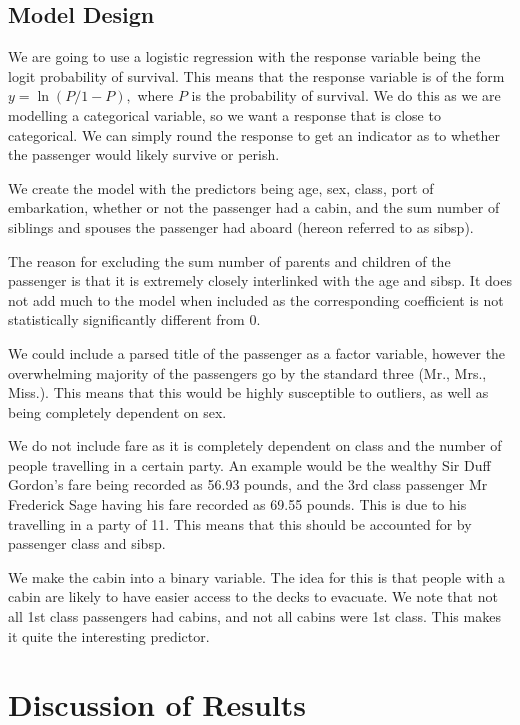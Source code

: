 \documentclass[]{extarticle}
\begin{document}
\subsection{Model Design}

We are going to use a logistic regression with the response variable being the logit probability of survival. This means that the response variable is of the form $y = \ln(P/1-P),$ where $P$ is the probability of survival. We do this as we are modelling a categorical variable, so we want a response that is close to categorical. We can simply round the response to get an indicator as to whether the passenger would likely survive or perish.

We create the model with the predictors being age, sex, class, port of embarkation, whether or not the passenger had a cabin, and the sum number of siblings and spouses the passenger had aboard (hereon referred to as sibsp).

The reason for excluding the sum number of parents and children of the passenger is that it is extremely closely interlinked with the age and sibsp. It does not add much to the model when included as the corresponding coefficient is not statistically significantly different from 0.

We could include a parsed title of the passenger as a factor variable, however the overwhelming majority of the passengers go by the standard three (Mr., Mrs., Miss.). This means that this would be highly susceptible to outliers, as well as being completely dependent on sex.

We do not include fare as it is completely dependent on class and the number of people travelling in a certain party. An example would be the wealthy Sir Duff Gordon's fare being recorded as 56.93 pounds, and the 3rd class passenger Mr Frederick Sage having his fare recorded as 69.55 pounds. This is due to his travelling in a party of 11. This means that this should be accounted for by passenger class and sibsp.

We make the cabin into a binary variable. The idea for this is that people with a cabin are likely to have easier access to the decks to evacuate. We note that not all 1st class passengers had cabins, and not all cabins were 1st class. This makes it quite the interesting predictor.

\section{Discussion of Results}
\end{document}
